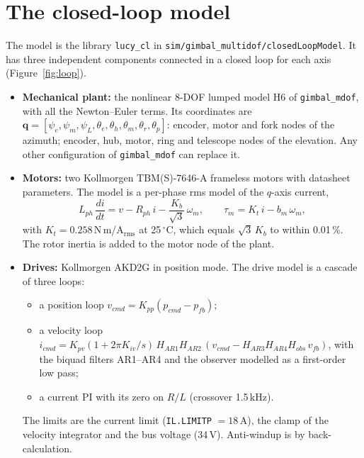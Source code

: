 \documentclass[10pt,a4paper]{article}
\numberwithin{equation}{section}
\begin{document}
\tableofcontents

\section{The closed-loop model}\label{sec:model}
The model is the library \texttt{lucy\_cl} in \texttt{sim/gimbal\_multidof/closedLoopModel}. It has three independent components connected in a closed loop for each axis (Figure~\ref{fig:loop}).
\begin{itemize}
\item \textbf{Mechanical plant:} the nonlinear 8-DOF lumped model H6 of \texttt{gimbal\_mdof}, with all the Newton--Euler terms. Its coordinates are $\mathbf q=[\psi_e,\psi_m,\psi_L,\theta_e,\theta_h,\theta_m,\theta_r,\theta_p]$: encoder, motor and fork nodes of the azimuth; encoder, hub, motor, ring and telescope nodes of the elevation. Any other configuration of \texttt{gimbal\_mdof} can replace it.
\item \textbf{Motors:} two Kollmorgen TBM(S)-7646-A frameless motors with datasheet parameters. The model is a per-phase rms model of the $q$-axis current,
\begin{equation}
L_{ph}\,\frac{di}{dt}=v-R_{ph}\,i-\frac{K_b}{\sqrt3}\,\omega_m,\qquad \tau_m=K_t\,i-b_m\,\omega_m ,
\end{equation}
with $K_t=0.258$\,N\,m/A$_\mathrm{rms}$ at 25\,$^\circ$C, which equals $\sqrt3\,K_b$ to within 0.01\,\%. The rotor inertia is added to the motor node of the plant.
\item \textbf{Drives:} Kollmorgen AKD2G in position mode. The drive model is a cascade of three loops:
  \begin{itemize}
  \item a position loop $v_{cmd}=K_{pp}(p_{cmd}-p_{fb})$;
  \item a velocity loop $i_{cmd}=K_{pv}(1+2\pi K_{iv}/s)\,H_{AR1}H_{AR2}\,(v_{cmd}-H_{AR3}H_{AR4}H_{obs}\,v_{fb})$, with the biquad filters AR1--AR4 and the observer modelled as a first-order low pass;
  \item a current PI with its zero on $R/L$ (crossover 1.5\,kHz).
  \end{itemize}
  The limits are the current limit (\texttt{IL.LIMITP} $=18$\,A), the clamp of the velocity integrator and the bus voltage (34\,V). Anti-windup is by back-calculation.
\end{itemize}
\end{document}
